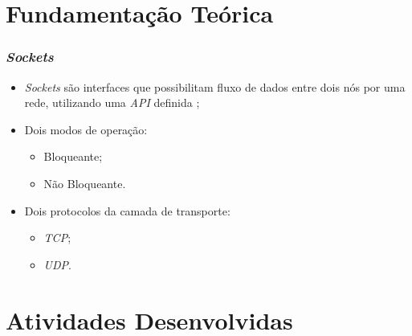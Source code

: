 \documentclass{beamer}
\begin{document}
\section{Fundamentação Teórica}

\begin{frame} \frametitle{\emph{Sockets}}
\begin{itemize}
	\item \justifying \emph{Sockets} são interfaces que possibilitam fluxo de dados entre dois nós por uma rede, utilizando uma \emph{API} definida \cite{Tanenbaum};
	\item Dois modos de operação:
	\begin{itemize}
		\item Bloqueante;
		\item Não Bloqueante.
	\end{itemize}
	\item \justifying Dois protocolos da camada de transporte:
	\begin{itemize}
		\item \emph{TCP};
		\item \emph{UDP}.
	\end{itemize}
\end{itemize}
\end{frame}

\section{Atividades Desenvolvidas}
\end{document}
